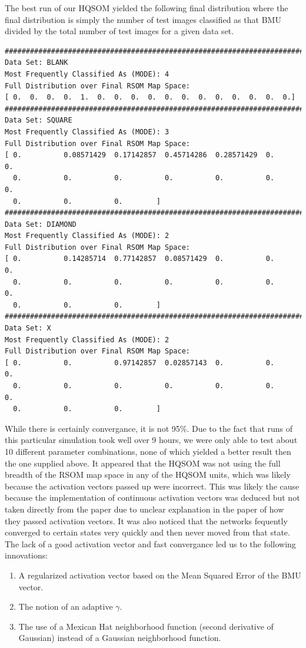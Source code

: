 \documentclass[a4paper,10pt]{article}
\begin{document}
The best
run of our HQSOM yielded the following final distribution where the final distribution is simply the
number of test images classified as that BMU divided by the total number of test images for a given
data set.

\begin{center}
\small
\begin{verbatim}
################################################################################
Data Set: BLANK
Most Frequently Classified As (MODE): 4
Full Distribution over Final RSOM Map Space:
[ 0.  0.  0.  0.  1.  0.  0.  0.  0.  0.  0.  0.  0.  0.  0.  0.  0.]
################################################################################
Data Set: SQUARE
Most Frequently Classified As (MODE): 3
Full Distribution over Final RSOM Map Space:
[ 0.          0.08571429  0.17142857  0.45714286  0.28571429  0.          0.
  0.          0.          0.          0.          0.          0.          0.
  0.          0.          0.        ]
################################################################################
Data Set: DIAMOND
Most Frequently Classified As (MODE): 2
Full Distribution over Final RSOM Map Space:
[ 0.          0.14285714  0.77142857  0.08571429  0.          0.          0.
  0.          0.          0.          0.          0.          0.          0.
  0.          0.          0.        ]
################################################################################
Data Set: X
Most Frequently Classified As (MODE): 2
Full Distribution over Final RSOM Map Space:
[ 0.          0.          0.97142857  0.02857143  0.          0.          0.
  0.          0.          0.          0.          0.          0.          0.
  0.          0.          0.        ]

\end{verbatim} 
\end{center}

While there is certainly convergance, it is not 95\%.  Due to the fact that runs of this particular
simulation took well over 9 hours, we were only able to test about 10 different
parameter combinations, none of which yielded a better result then the one supplied above.  It
appeared that the HQSOM was not using the full breadth of the RSOM map space in any of the HQSOM
units, which was likely because the activation vectors passed up were incorrect.  This was likely
the cause because the implementation of continuous activation vectors was deduced but not taken
directly from the paper due to unclear explanation in the paper of how they passed activation
vectors.  It was also noticed that the networks fequently converged to certain states very quickly
and then never moved from that state.  The lack of a good activation vector and fast convergance
led us to the following innovations:
\begin{enumerate}
\item A regularized activation vector based on the Mean Squared Error of the BMU vector.
\item The notion of an adaptive $\gamma$.
\item The use of a Mexican Hat neighborhood function (second derivative of Gaussian) instead of a
Gaussian neighborhood function.
\end{enumerate}
 
\end{document}
